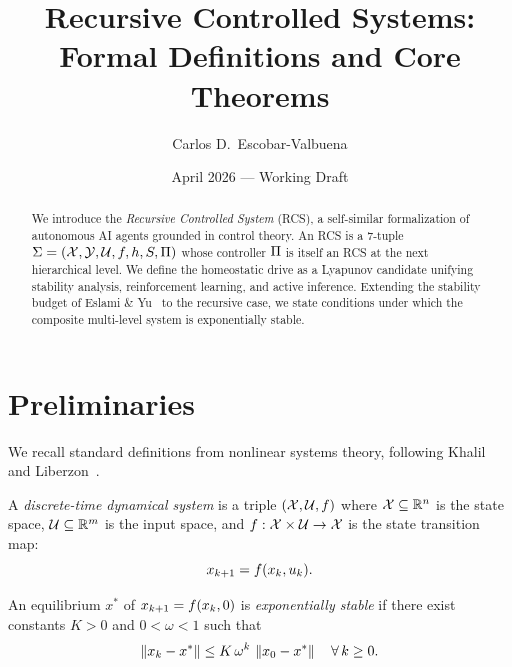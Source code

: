 \documentclass[11pt,a4paper]{article}
\title{Recursive Controlled Systems:\\
Formal Definitions and Core Theorems}
\author{Carlos D.\ Escobar-Valbuena}
\date{April 2026 --- Working Draft}
\begin{document}
\maketitle

\begin{abstract}
We introduce the \emph{Recursive Controlled System} (RCS), a self-similar
formalization of autonomous AI agents grounded in control theory.  An RCS is a
7-tuple $\Sigma = (\mathcal{X}, \mathcal{Y}, \mathcal{U}, f, h, S, \Pi)$ whose controller
$\Pi$ is itself an RCS at the next hierarchical level.  We define the
homeostatic drive as a Lyapunov candidate unifying stability analysis,
reinforcement learning, and active inference.  Extending the stability budget
of Eslami \& Yu~\cite{eslami2026control} to the recursive case, we state
conditions under which the composite multi-level system is exponentially
stable.
\end{abstract}

\tableofcontents
\newpage

\section{Preliminaries}

We recall standard definitions from nonlinear systems theory, following
Khalil~\cite{khalil2002nonlinear} and Liberzon~\cite{liberzon2003switching}.

\begin{definition}
A \emph{discrete-time dynamical system} is a triple $(\mathcal{X}, \mathcal{U}, f)$ where
$\mathcal{X} \subseteq \mathbb{R}^n$ is the state space, $\mathcal{U} \subseteq \mathbb{R}^m$ is the
input space, and $f : \mathcal{X} \times \mathcal{U} \to \mathcal{X}$ is the state transition map:
\begin{equation}
  x_{k+1} = f(x_k, u_k).
\end{equation}
\end{definition}

\begin{definition}
An equilibrium $x^*$ of $x_{k+1} = f(x_k, 0)$ is \emph{exponentially
stable} if there exist constants $K > 0$ and $0 < \omega < 1$ such that
\begin{equation}
  \left\| x_k - x^* \right\| \leq K \, \omega^k \, \left\| x_0 - x^* \right\|
  \quad \forall\, k \geq 0.
\end{equation}
\end{definition}
\end{document}
